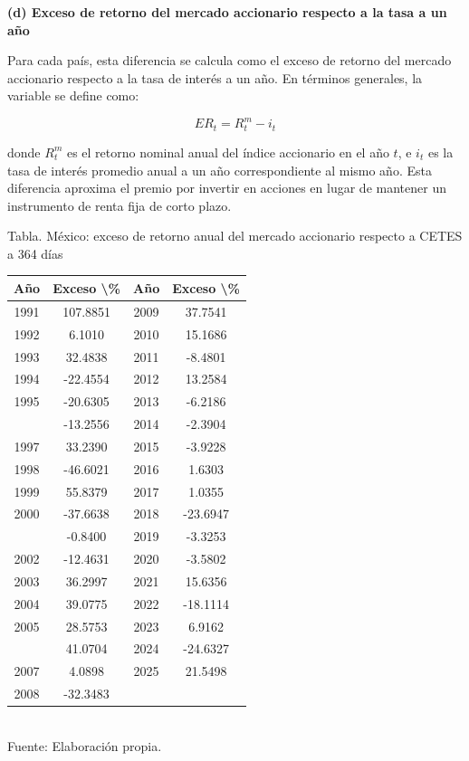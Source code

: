 \documentclass{article}\usepackage[]{graphicx}\usepackage[]{xcolor}
\begin{document}
\newpage
\textbf{(d) Exceso de retorno del mercado accionario respecto a la tasa a un año}

Para cada país, esta diferencia se calcula como el exceso de retorno del mercado accionario respecto a la tasa de interés a un año. En términos generales, la variable se define como:

\[
ER_t = R^{m}_t - i_t
\]

donde \(R^{m}_t\) es el retorno nominal anual del índice accionario en el año \(t\), e \(i_t\) es la tasa de interés promedio anual a un año correspondiente al mismo año. Esta diferencia aproxima el premio por invertir en acciones en lugar de mantener un instrumento de renta fija de corto plazo.



\begin{center}
Tabla. México: exceso de retorno anual del mercado accionario respecto a CETES a 364 días
\end{center}
\begin{center}

\begin{tabular}{cccc}
\toprule
Año & Exceso \textbackslash{}\% & Año & Exceso \textbackslash{}\%\\
\midrule
1991 & 107.8851 & 2009 & 37.7541\\
1992 & 6.1010 & 2010 & 15.1686\\
1993 & 32.4838 & 2011 & -8.4801\\
1994 & -22.4554 & 2012 & 13.2584\\
1995 & -20.6305 & 2013 & -6.2186\\
\addlinespace
1996 & -13.2556 & 2014 & -2.3904\\
1997 & 33.2390 & 2015 & -3.9228\\
1998 & -46.6021 & 2016 & 1.6303\\
1999 & 55.8379 & 2017 & 1.0355\\
2000 & -37.6638 & 2018 & -23.6947\\
\addlinespace
2001 & -0.8400 & 2019 & -3.3253\\
2002 & -12.4631 & 2020 & -3.5802\\
2003 & 36.2997 & 2021 & 15.6356\\
2004 & 39.0775 & 2022 & -18.1114\\
2005 & 28.5753 & 2023 & 6.9162\\
\addlinespace
2006 & 41.0704 & 2024 & -24.6327\\
2007 & 4.0898 & 2025 & 21.5498\\
2008 & -32.3483 &  & \\
\bottomrule
\end{tabular}
\\[0.3em]
{\footnotesize Fuente: Elaboración propia.}
\end{center}
\end{document}
